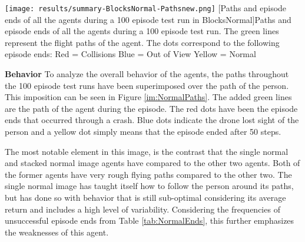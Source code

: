 \begin{SCfigure}[][h]
    \centering
    \texttt{[image: results/summary-BlocksNormal-Pathsnew.png]}
    [Paths and episode ends of all the agents during a 100 episode test run in BlocksNormal]{Paths and episode ends of all the agents during a 100 episode test run. 
    The green lines represent the flight paths of the agent.\newline\newline
    The dots correspond to the following episode ends: \newline
    Red = Collisions\newline
    Blue = Out of View \newline
    Yellow = Normal\newline\newline\newline\newline\newline\newline\newline\newline\newline\newline\newline\newline\newline}
    \label{im:NormalPaths}
\end{SCfigure}

\noindent
\textbf{Behavior} \newline
To analyze the overall behavior of the agents, the paths throughout the 100 episode 
test runs have been superimposed over the path of the person. This imposition can be 
seen in Figure \ref{im:NormalPaths}. The added green lines are the path of the agent 
during the episode. The red dots have been the episode ends that occurred through a crash. 
Blue dots indicate the drone lost sight of the person and a yellow dot simply means that the 
episode ended after 50 steps. 

The most notable element in this image, is the contrast that 
the single normal and stacked normal image agents have compared to the 
other two agents. Both of the former agents have very rough flying paths compared 
to the other two. The single normal image has taught itself how to follow the person around its 
paths, but has done so with behavior that is still sub-optimal considering its average return and 
includes a high level of variability. Considering the frequencies of unsuccessful episode ends from 
Table \ref{tab:NormalEnds}, this further emphasizes the weaknesses of this agent. 

